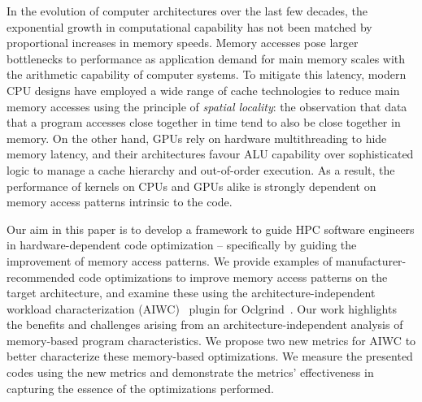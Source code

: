 \documentclass[review=false, sigchi]{acmart}
\begin{document}
	In the evolution of computer architectures over the last few decades, the exponential growth in computational capability has not been matched by proportional increases in memory speeds\cite{hennessycomparch}.
	Memory accesses pose larger bottlenecks to performance as application demand for main memory scales with the arithmetic capability of computer systems.
	To mitigate this latency, modern CPU designs have employed a wide range of cache technologies to reduce main memory accesses using the principle of \emph{spatial locality}: the observation that data that a program accesses close together in time tend to also be close together in memory.
	On the other hand, GPUs rely on hardware multithreading to hide memory latency, and their architectures favour ALU capability over sophisticated logic to manage a cache hierarchy and out-of-order execution. As a result, the performance of kernels on CPUs and GPUs alike is strongly dependent on memory access patterns intrinsic to the code. %
	
	
	
	Our aim in this paper is to develop a framework to guide HPC software engineers in hardware-dependent code optimization -- specifically by guiding the improvement of memory access patterns.
	We provide examples of manufacturer-recommended code optimizations to improve memory access patterns on the target architecture, and examine these using the architecture-independent workload characterization (AIWC)~\cite{beauaiwc} plugin for Oclgrind~\cite{price:15}.
	Our work highlights the benefits and challenges arising from an architecture-independent analysis of memory-based program characteristics.
	We propose two new metrics for AIWC to better characterize these memory-based optimizations.
	We measure the presented codes using the new metrics and demonstrate the metrics' effectiveness in capturing the essence of the optimizations performed.
	
\end{document}
